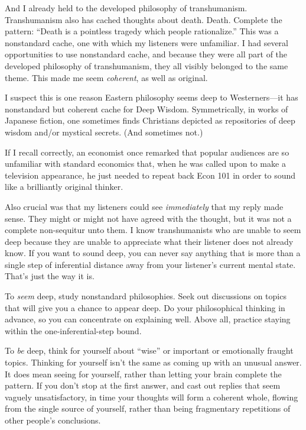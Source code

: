 {
 And I already held to the developed philosophy of transhumanism.
Transhumanism also has cached thoughts about death. Death. Complete the
pattern: ``Death is a pointless tragedy which people
rationalize.'' This was a nonstandard cache, one with
which my listeners were unfamiliar. I had several opportunities to use
nonstandard cache, and because they were all part of the developed
philosophy of transhumanism, they all visibly belonged to the same
theme. This made me seem \textit{coherent}, as well as original.}

{
 I suspect this is one reason Eastern philosophy seems deep to
Westerners---it has nonstandard but coherent cache for Deep Wisdom.
Symmetrically, in works of Japanese fiction, one sometimes finds
Christians depicted as repositories of deep wisdom and/or mystical
secrets. (And sometimes not.)}

{
 If I recall correctly, an economist once remarked that popular
audiences are so unfamiliar with standard economics that, when he was
called upon to make a television appearance, he just needed to repeat
back Econ 101 in order to sound like a brilliantly original thinker.}

{
 Also crucial was that my listeners could see \textit{immediately}
that my reply made sense. They might or might not have agreed with the
thought, but it was not a complete non-sequitur unto them. I know
transhumanists who are unable to seem deep because they are unable to
appreciate what their listener does not already know. If you want to
sound deep, you can never say anything that is more than a single step
of inferential distance away from your listener's
current mental state. That's just the way it is.}

{
 To \textit{seem} deep, study nonstandard philosophies. Seek out
discussions on topics that will give you a chance to appear deep. Do
your philosophical thinking in advance, so you can concentrate on
explaining well. Above all, practice staying within the
one-inferential-step bound.}

{
 To \textit{be} deep, think for yourself about
``wise'' or important or emotionally
fraught topics. Thinking for yourself isn't the same as
coming up with an unusual answer. It does mean seeing for yourself,
rather than letting your brain complete the pattern. If you
don't stop at the first answer, and cast out replies
that seem vaguely unsatisfactory, in time your thoughts will form a
coherent whole, flowing from the single source of yourself, rather than
being fragmentary repetitions of other people's
conclusions.}

